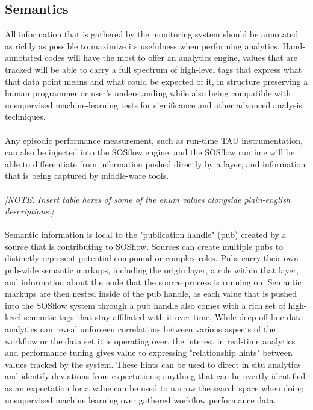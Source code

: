 \documentclass[10pt, conference, compsocconf]{IEEEtran}
\begin{document}
\subsection{Semantics}
All information that is gathered by the monitoring system should be annotated 
as richly as possible to maximize its usefulness when performing analytics. 
Hand-annotated codes will have the most to offer an analytics engine,  
values that are tracked will be able to carry a full spectrum of high-level 
tags that express what that data point means and what could be expected of it, 
in structure preserving a human programmer or user's understanding while also
being compatible with unsupervised machine-learning tests for significance and 
other advanced analysis techniques.\\
\\
Any episodic performance measurement, such as run-time TAU instrumentation, can 
also be injected into the SOSflow engine, and the SOSflow runtime will be able to 
differentiate from information pushed directly by a layer, and information that 
is being captured by middle-ware tools.\\
\\
\textit{[NOTE: Insert table heres of some of the enum values alongside 
plain-english descriptions.]}\\
\\
Semantic information is local to the "publication handle" (pub) 
created by a source that is contributing to SOSflow.  Sources can create 
multiple pubs to distinctly represent potential compound or complex roles. Pubs 
carry their own pub-wide semantic markups, including 
the origin layer, a role within that layer, and information 
about the node that the source process is running on. Semantic markups are then 
nested inside of the pub handle, as each value that is pushed 
into the SOSflow system through a pub handle also comes with a rich set of 
high-level semantic tags that stay affiliated with it over time. While deep 
off-line data analytics 
can reveal unforseen correlations between various aspects of the workflow or the 
data set it is operating over, the interest in real-time analytics and 
performance tuning gives value to expressing "relationship hints" between 
values tracked by the system. These hints can be used to direct in situ 
analytics and identify deviations from expectations; anything that can be 
overtly identified as an expectation for a value can be used to narrow the 
search space when doing unsupervised machine learning over gathered workflow 
performance data.
\end{document}
